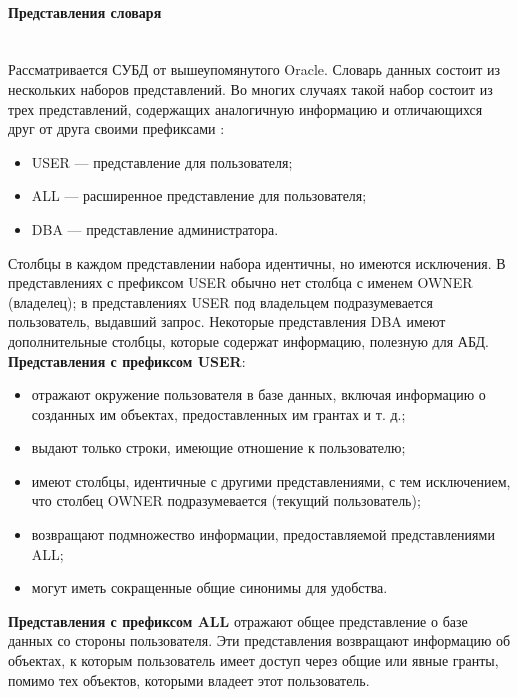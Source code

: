 \paragraph{Представления словаря} ~\\

Рассматривается СУБД от вышеупомянутого Oracle. Словарь данных состоит из нескольких наборов представлений. Во многих случаях такой набор состоит из трех представлений, содержащих аналогичную информацию и отличающихся друг от друга своими префиксами \autocite{Kirillov2009}:
\begin{itemize}
\item USER — представление для пользователя;
\item ALL — расширенное представление для пользователя;
\item DBA — представление администратора.
\end{itemize}

Столбцы в каждом представлении набора идентичны, но имеются исключения. В представлениях с префиксом USER обычно нет столбца с именем OWNER
(владелец); в представлениях USER под владельцем подразумевается пользователь, выдавший запрос. Некоторые представления DBA имеют дополнительные столбцы, которые содержат информацию, полезную для АБД. ~\\

\textbf{Представления с префиксом USER}:
\begin{itemize}
\item отражают окружение пользователя в базе данных, включая информацию
о созданных им объектах, предоставленных им грантах и т. д.;
\item выдают только строки, имеющие отношение к пользователю;
\item имеют столбцы, идентичные с другими представлениями, с тем исключением, что столбец OWNER подразумевается (текущий пользователь);
\item возвращают подмножество информации, предоставляемой представлениями ALL;
\item могут иметь сокращенные общие синонимы для удобства.
\end{itemize}

\textbf{Представления с префиксом ALL} отражают общее представление о базе
данных со стороны пользователя. Эти представления возвращают информацию об объектах, к которым пользователь имеет доступ через общие или явные гранты, помимо тех объектов, которыми владеет этот пользователь. ~\\

